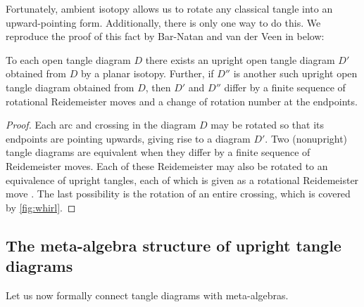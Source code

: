 Fortunately, ambient isotopy allows us to rotate any classical tangle into an
upward-pointing form. Additionally, there is only one way to do this. We
reproduce the proof of this fact by Bar-Natan and van der Veen in \cite{BV}
below:

\begin{lemma}
        To each open tangle diagram $D$ there exists an upright open tangle
        diagram $D'$ obtained from $D$ by a planar isotopy. Further, if $D''$ is
        another such upright open tangle diagram obtained from $D$, then $D'$
        and $D''$ differ by a finite sequence of rotational Reidemeister moves
        and a change of rotation number at the endpoints.
\end{lemma}
\begin{proof}
        Each arc and crossing in the diagram $D$ may be rotated so that its
        endpoints are pointing upwards, giving rise to a diagram $D'$. Two
        (nonupright) tangle diagrams are equivalent when they differ by a finite
        sequence of Reidemeister moves. Each of these Reidemeister may also be
        rotated to an equivalence of upright tangles, each of which is given as
        a rotational Reidemeister move . The
        last possibility is the rotation of an entire crossing, which is covered
        by \cref{fig:whirl}.
\end{proof}

\subsection{The meta-algebra structure of upright tangle diagrams}

Let us now formally connect tangle diagrams with meta-algebras.

